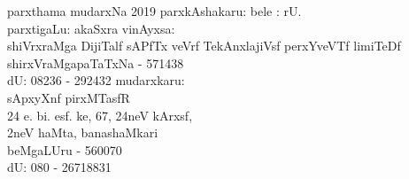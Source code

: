\thispagestyle{empty}
\begin{flushleft}
parxthama mudarxNa 2019
\vfill
parxkAshakaru:
\vfill
bele : rU.\\
parxtigaLu:
\vfill
akaSxra vinAyxsa:\\ shiVrxraMga DijiTalf sAPfTx veVrf TekAnxlajiVsf perxYveVTf limiTeDf\\ shirxVraMgapaTaTxNa - 571438\\ dU: 08236 - 292432
\vfill
mudarxkaru:\\ sApxyXnf pirxMTasfR\\ 24 e. bi. esf. ke, 67, 24neV kArxsf,\\ 2neV haMta, banashaMkari\\ beMgaLUru - 560070 \\ dU: 080 - 26718831

\end{flushleft}
